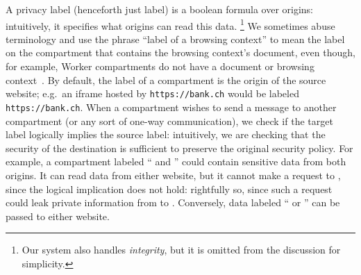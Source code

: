 A privacy label (henceforth just label) is a boolean formula over
origins:  intuitively, it specifies what origins can read this data.%
\footnote{
  Our system also handles \emph{integrity}, but it is omitted from
  the discussion for simplicity.
}
%
We sometimes abuse terminology and use the phrase  ``label of a
browsing context'' to mean the label on the compartment that contains
the browsing context's document, even though, for example, Worker
compartments do not have a document or browsing
context~\cite{workers}.
%
By default, the label of a compartment is the origin of the source
website; e.g.\ an iframe hosted by {\tt https://bank.ch} would be
labeled {\tt https://bank.ch}.
%
When a compartment wishes to send a message to another compartment (or
any sort of one-way communication), we check if the target
label logically implies the source label: intuitively, we are checking
that the security of the destination is sufficient to preserve the
original security policy.
%
For example, a compartment labeled `` and ''
could contain sensitive data from both origins.
%
%
It can read data from either website, but
it cannot make a request to , since the logical
implication does not hold: rightfully
so, since such a request could leak private information from 
to .
%
Conversely, data labeled `` or ''
can be passed to either website. 
%


